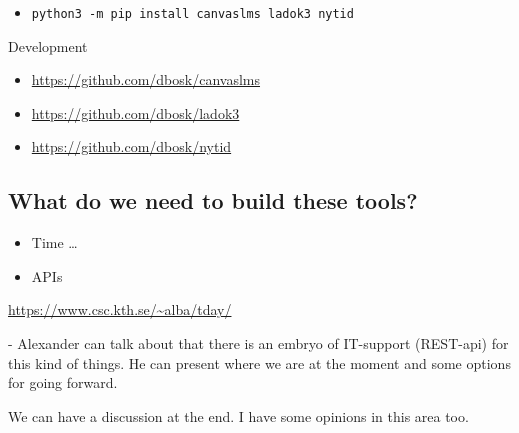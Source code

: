 \begin{frame}[fragile]
  \begin{example}[Installation]
    \begin{itemize}
      \item \texttt{python3 -m pip install canvaslms ladok3 nytid}
    \end{itemize}
  \end{example}

  \pause

  \begin{block}{Development}
    \begin{itemize}
      \item \url{https://github.com/dbosk/canvaslms}
      \item \url{https://github.com/dbosk/ladok3}
      \item \url{https://github.com/dbosk/nytid}
    \end{itemize}
  \end{block}
\end{frame}

\subsection{What do we need to build these tools?}

\begin{frame}[fragile]
  \begin{example}
    \begin{itemize}
      \item Time \dots
      \item \alert<2>{APIs}
    \end{itemize}
  \end{example}
\end{frame}

\begin{frame}[fragile]
  \begin{center}
    \url{https://www.csc.kth.se/~alba/tday/}
  \end{center}
\end{frame}

- Alexander can talk about that there is an embryo of IT-support
(REST-api) for this kind of things. He can present where we are at the
moment and some options for going forward.

We can have a discussion at the end. I have some opinions in this area
too.

